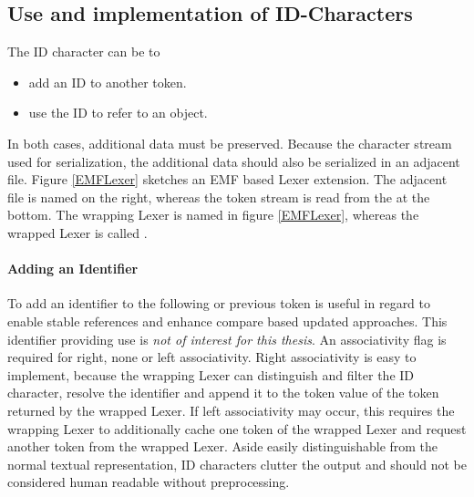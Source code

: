 \subsection{Use and implementation of ID-Characters}
 
The ID character can be to
\begin{itemize}
	\item add an ID to another token.
	\item use the ID to refer to an object.
\end{itemize}
In both cases, additional data must be preserved. Because the character stream used for serialization, the additional data should also be serialized in an adjacent file. Figure \ref{EMFLexer} sketches an EMF based Lexer extension. The adjacent file is named  on the right, whereas the token stream is read from the  at the bottom. The wrapping Lexer is named  in figure \ref{EMFLexer}, whereas the wrapped Lexer is called .  

\paragraph{Adding an Identifier} To add an identifier to the following or previous token is useful in regard to enable stable references and enhance compare based updated approaches. This identifier providing use is \emph{not of interest for this thesis}. An associativity flag is required for right, none or left associativity.  Right associativity is easy to implement, because the wrapping Lexer can distinguish and filter the ID character, resolve the identifier and append it to the token value of the token returned by the wrapped Lexer. If left associativity may occur, this requires the wrapping Lexer to additionally cache one token of the wrapped Lexer and request another token from the wrapped Lexer. Aside easily distinguishable from the normal textual representation, ID characters clutter the output and should not be considered human readable without preprocessing. 
 
